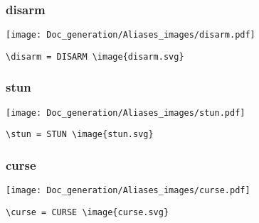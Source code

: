\documentclass{article}
\begin{document}
\subsubsection{disarm}
\begin{minipage}{0.45\linewidth}
\raggedright
\begin{spverbatim}
\disarm
\end{spverbatim}
\end{minipage}
\begin{minipage}{0.45\linewidth}
\raggedleft
\texttt{[image: Doc\_generation/Aliases\_images/disarm.pdf]}
\end{minipage}
\begin{center}
\begin{BVerbatim}
\disarm = DISARM \image{disarm.svg}
\end{BVerbatim}
\end{center}

\subsubsection{stun}
\begin{minipage}{0.45\linewidth}
\raggedright
\begin{spverbatim}
\stun
\end{spverbatim}
\end{minipage}
\begin{minipage}{0.45\linewidth}
\raggedleft
\texttt{[image: Doc\_generation/Aliases\_images/stun.pdf]}
\end{minipage}
\begin{center}
\begin{BVerbatim}
\stun = STUN \image{stun.svg}
\end{BVerbatim}
\end{center}

\subsubsection{curse}
\begin{minipage}{0.45\linewidth}
\raggedright
\begin{spverbatim}
\curse
\end{spverbatim}
\end{minipage}
\begin{minipage}{0.45\linewidth}
\raggedleft
\texttt{[image: Doc\_generation/Aliases\_images/curse.pdf]}
\end{minipage}
\begin{center}
\begin{BVerbatim}
\curse = CURSE \image{curse.svg}
\end{BVerbatim}
\end{center}
\end{document}
